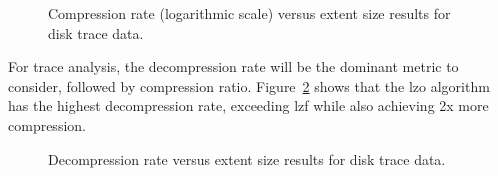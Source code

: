 
\begin{figure}[tbh]
\caption{ Compression rate (logarithmic scale) versus extent size results for disk trace data.}
\label{fig:comRates}
\end{figure}

For trace analysis, the decompression rate will be the dominant metric to
consider, followed by compression ratio.
Figure~\ref{fig:decomRates} shows that the lzo algorithm has the
highest decompression rate, exceeding lzf while also achieving 
2x more compression.  



\begin{figure}[tbh]
\caption{ Decompression rate versus extent size results for disk trace data.}
\label{fig:decomRates}
\end{figure}

